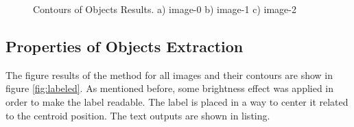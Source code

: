\documentclass[]{IEEEtran}
\begin{document}
\begin{figure}[]
  \centering
  \caption{Contours of Objects Results. a) image-0 b) image-1 c) image-2}
  \label{fig:contours}
\end{figure}

\subsection{Properties of Objects Extraction}
The figure results of the method for all images and their contours are show in figure \ref{fig:labeled}. As mentioned before, some brightness effect was applied in order to make the label readable. The label is placed in a way to center it related to the centroid position. The text outputs are shown in listing.
\end{document}

